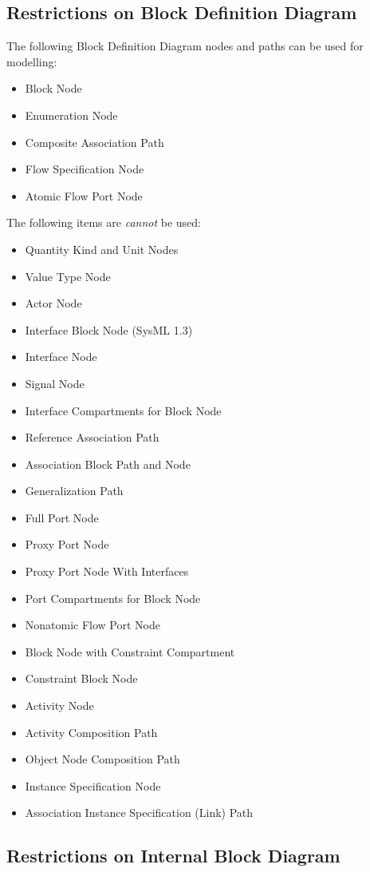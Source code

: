 \subsection{Restrictions on Block Definition Diagram}

The following Block Definition Diagram nodes and paths can be used for
modelling:
\begin{itemize}
\item Block Node
\item Enumeration Node
\item Composite Association Path
\item Flow Specification Node
\item Atomic Flow Port Node
\end{itemize}

The following items are \emph{cannot} be used:
\begin{itemize}
\item Quantity Kind and Unit Nodes
\item Value Type Node
\item Actor Node
\item Interface Block Node (SysML 1.3)
\item Interface Node
\item Signal Node
\item Interface Compartments for Block Node
\item Reference Association Path
\item Association Block Path and Node
\item Generalization Path
\item Full Port Node
\item Proxy Port Node
\item Proxy Port Node With Interfaces
\item Port Compartments for Block Node
\item Nonatomic Flow Port Node
\item Block Node with Constraint Compartment
\item Constraint Block Node
\item Activity Node
\item Activity Composition Path
\item Object Node Composition Path
\item Instance Specification Node
\item Association Instance Specification (Link) Path
\end{itemize}

\subsection{Restrictions on Internal Block Diagram}

